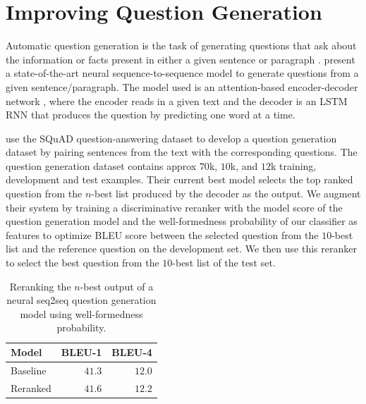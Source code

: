 \documentclass[11pt,a4paper]{article}
\newcommand{\ignore}[1]{}
\begin{document}
\section{Improving Question Generation}
\label{sec:extrinsic}

Automatic question generation is the task of generating questions that ask about the
information or facts present in either a given sentence or paragraph
\cite{Vanderwende:2008,Heilman:2010}.  present a state-of-the-art
neural sequence-to-sequence model to generate questions from a given sentence/paragraph.
The model used is an attention-based encoder-decoder network \cite{attention},
where the encoder reads in  a given text and the decoder is an LSTM RNN that
produces the  question by predicting one word at a time. \ignore{conditioned on the current
hidden layer and the attention-weighted hidden layers of the encoder.}

 use the SQuAD question-answering dataset \cite{squad} to
develop a question generation dataset by pairing sentences from the text with the
corresponding questions. 
The question generation dataset contains approx $70$k, $10$k, and $12$k training, development and test examples.
Their current best model selects the
top ranked question from the $n$-best list produced by the decoder as the output.
We augment their system by training a discriminative reranker
\cite{collins:2005} with the model score of the question generation model and the
well-formedness probability of our classifier as features to optimize BLEU score
\cite{bleu} between the selected question from the $10$-best list and the reference
question on the development set. We then use this reranker to select the best question
from the $10$-best list of the test set.

\begin{table}[!tb]
  \centering
  \begin{tabular}{|lrr|}
  \hline
  Model & BLEU-1 & BLEU-4\\
  \hline
  Baseline & $41.3$ & $12.0$ \\
  Reranked & $\mathbf{41.6}$ & $\mathbf{12.2}$ \\
  \hline
  \end{tabular}
  \caption{Reranking the $n$-best output of a neural seq2seq question generation model using well-formedness probability.}
  \label{tab:rerank}
\end{table}
\end{document}

